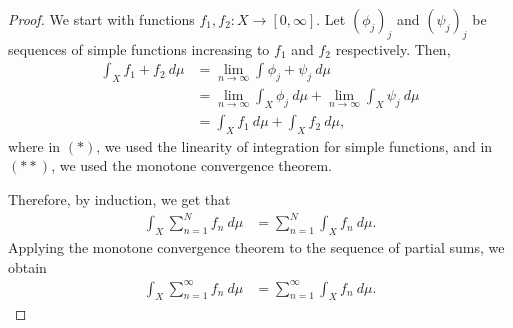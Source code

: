 \documentclass[12pt]{mypackage}
\begin{document}
\begin{proof}
  We start with functions $f_1,f_2\colon X\rightarrow [0,\infty]$. Let $\left( \phi_j \right)_j$ and $\left( \psi_j \right)_j$ be sequences of simple functions increasing to $f_1$ and $f_2$ respectively. Then,
  \begin{align*}
    \int_{X}^{} f_1 + f_2\:d\mu &= \lim_{n\rightarrow\infty} \int_{}^{} \phi_j + \psi_j\:d\mu\\
                                &= \lim_{n\rightarrow\infty} \int_{X}^{} \phi_j\:d\mu + \lim_{n\rightarrow\infty} \int_{X}^{} \psi_j\:d\mu\tag{$\ast$}\\
                                &= \int_{X}^{} f_1\:d\mu + \int_{X}^{} f_2\:d\mu, \tag{$\ast\ast$}
  \end{align*}
  where in $(\ast)$, we used the linearity of integration for simple functions, and in $(\ast\ast)$, we used the monotone convergence theorem.\newline

  Therefore, by induction, we get that
  \begin{align*}
    \int_{X}^{} \sum_{n=1}^{N}f_n\:d\mu &= \sum_{n=1}^{N} \int_{X}^{} f_n\:d\mu.
  \end{align*}
  Applying the monotone convergence theorem to the sequence of partial sums, we obtain
  \begin{align*}
    \int_{X}^{} \sum_{n=1}^{\infty}f_n\:d\mu &= \sum_{n=1}^{\infty} \int_{X}^{} f_n\:d\mu.
  \end{align*}
\end{proof}
\end{document}
